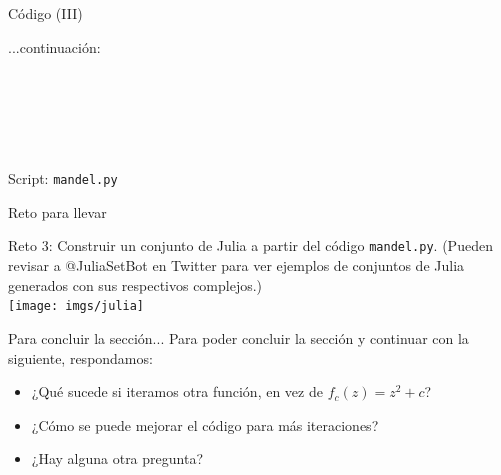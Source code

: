 \documentclass[usenames,dvipsnames]{beamer}
\begin{document}
  \begin{frame}{Código (III)}
    \begin{block}{...continuación:}
      \vspace*{0.5cm}
      \\
      \\
      \\
      \\
      \\
      \vspace*{0.5cm}
      \\
      \vspace*{0.5cm}
    \end{block}
    Script: \texttt{mandel.py}
  \end{frame}

  \begin{frame}{Reto para llevar}
    \vspace*{0.5cm}
    \begin{block}{Reto 3:}
      Construir un conjunto de Julia a partir del código \texttt{mandel.py}.
      (Pueden revisar a {\color{Turquoise} @JuliaSetBot} en Twitter para
      ver ejemplos de conjuntos de Julia generados con sus respectivos
      complejos.)\\
      \vspace*{0.5cm}
      \centering
      \texttt{[image: imgs/julia]}\\
      \vspace*{0.5cm}
    \end{block}
  \end{frame}

  \begin{frame}{Para concluir la sección...}
    Para poder concluir la sección y continuar con la siguiente,
    respondamos:
    \begin{itemize}
      \item ¿Qué sucede si iteramos otra función, en vez de
      $f_c(z) = z^2 + c$?
      \item ¿Cómo se puede mejorar el código para más iteraciones?
      \item ¿Hay alguna otra pregunta?
    \end{itemize}
  \end{frame}
\end{document}
